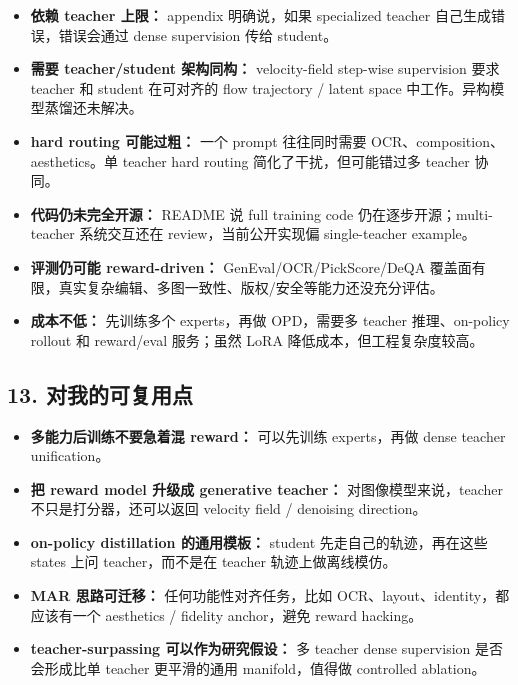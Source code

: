 \begin{itemize}[leftmargin=1.5em]
  \item \textbf{依赖 teacher 上限：} appendix 明确说，如果 specialized teacher 自己生成错误，错误会通过 dense supervision 传给 student。
  \item \textbf{需要 teacher/student 架构同构：} velocity-field step-wise supervision 要求 teacher 和 student 在可对齐的 flow trajectory / latent space 中工作。异构模型蒸馏还未解决。
  \item \textbf{hard routing 可能过粗：} 一个 prompt 往往同时需要 OCR、composition、aesthetics。单 teacher hard routing 简化了干扰，但可能错过多 teacher 协同。
  \item \textbf{代码仍未完全开源：} README 说 full training code 仍在逐步开源；multi-teacher 系统交互还在 review，当前公开实现偏 single-teacher example。
  \item \textbf{评测仍可能 reward-driven：} GenEval/OCR/PickScore/DeQA 覆盖面有限，真实复杂编辑、多图一致性、版权/安全等能力还没充分评估。
  \item \textbf{成本不低：} 先训练多个 experts，再做 OPD，需要多 teacher 推理、on-policy rollout 和 reward/eval 服务；虽然 LoRA 降低成本，但工程复杂度较高。
\end{itemize}

\subsection{13. 对我的可复用点}

\begin{itemize}[leftmargin=1.5em]
  \item \textbf{多能力后训练不要急着混 reward：} 可以先训练 experts，再做 dense teacher unification。
  \item \textbf{把 reward model 升级成 generative teacher：} 对图像模型来说，teacher 不只是打分器，还可以返回 velocity field / denoising direction。
  \item \textbf{on-policy distillation 的通用模板：} student 先走自己的轨迹，再在这些 states 上问 teacher，而不是在 teacher 轨迹上做离线模仿。
  \item \textbf{MAR 思路可迁移：} 任何功能性对齐任务，比如 OCR、layout、identity，都应该有一个 aesthetics / fidelity anchor，避免 reward hacking。
  \item \textbf{teacher-surpassing 可以作为研究假设：} 多 teacher dense supervision 是否会形成比单 teacher 更平滑的通用 manifold，值得做 controlled ablation。
\end{itemize}

